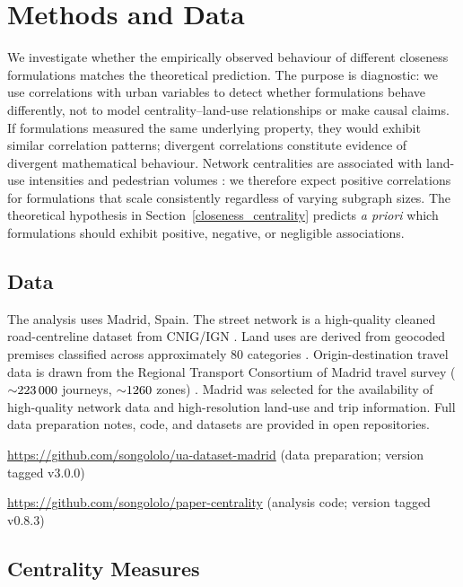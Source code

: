 \section{Methods and Data}\label{empirical-methodology}

We investigate whether the empirically observed behaviour of different closeness formulations matches the theoretical prediction. The purpose is diagnostic: we use correlations with urban variables to detect whether formulations behave differently, not to model centrality--land-use relationships or make causal claims. If formulations measured the same underlying property, they would exhibit similar correlation patterns; divergent correlations constitute evidence of divergent mathematical behaviour. Network centralities are associated with land-use intensities \cite{Porta2009} and pedestrian volumes \cite{Penn1998, sharmin_meta-analysis_2018}: we therefore expect positive correlations for formulations that scale consistently regardless of varying subgraph sizes. The theoretical hypothesis in Section~\ref{closeness_centrality} predicts \emph{a priori} which formulations should exhibit positive, negative, or negligible associations.

\subsection{Data}

The analysis uses Madrid, Spain. The street network is a high-quality cleaned road-centreline dataset from CNIG/IGN \cite{madrid_street_network}. Land uses are derived from  geocoded premises classified across approximately 80 categories \cite{madrid_premises}. Origin-destination travel data is drawn from the Regional Transport Consortium of Madrid travel survey (${\sim}\num{223000}$ journeys, ${\sim}\num{1260}$ zones) \cite{crtm_edm_2020, crtm_zones_2020}. Madrid was selected for the availability of high-quality network data and high-resolution land-use and trip information. Full data preparation notes, code, and datasets are provided in open repositories.

\url{https://github.com/songololo/ua-dataset-madrid} (data preparation; version tagged v3.0.0)

\url{https://github.com/songololo/paper-centrality} (analysis code; version tagged v0.8.3)

\subsection{Centrality Measures}

